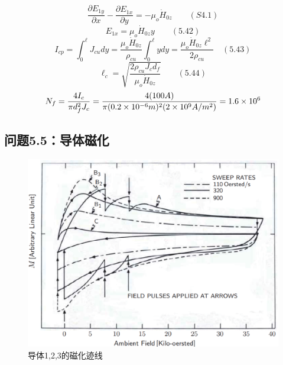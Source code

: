 \begin{equation}%
\frac{\partial E_{1y}}{\partial x}-\frac{\partial E_{1x}}{\partial y}=-\mu_{o}\dot{H}_{0z}\qquad(S4.1)
\end{equation}
\begin{equation}%
E_{1x}=\mu_{o}\dot{H}_{0z}y\qquad(5.42)
\end{equation}
\begin{equation}%
I_{cp}=\int_{0}^{\ell}J_{cu}dy=\frac{\mu_{o}\dot{H}_{0z}}{\rho_{cu}}\int_{0}^{\ell}ydy=\frac{\mu_{o}\dot{H}_{0z}\ell^{2}}{2\rho_{cu}}\quad(5.43)
\end{equation}
\begin{equation}%
\ell_{c}=\sqrt{\frac{2\rho_{cu}J_{c}d_{f}}{\mu_{o}\dot{H}_{0z}}}\qquad(5.44)
\end{equation}
\begin{equation}%
N_{f}=\frac{4I_{c}}{\pi d_{f}^{2}J_{c}}=\frac{4(100A)}{\pi(0.2\times10^{-6}m)^{2}(2\times10^{9}A/m^{2})}\\
=1.6\times10^{6}
\end{equation}


\subsection{问题5.5：导体磁化}




\begin{figure}
	\centering
	\includegraphics[scale=0.5]{chpt5/figs/fig5.21.eps}
	\caption{导体1,2,3的磁化迹线}
\end{figure}



